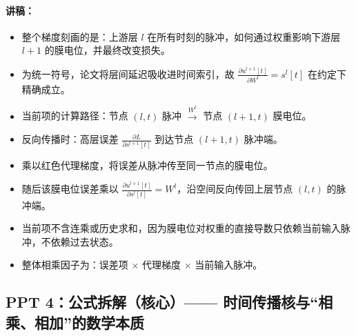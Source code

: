\documentclass[journal,12pt,onecolumn]{IEEEtran}
\begin{document}
\paragraph{\textbf{讲稿：}}
\begin{itemize}
    \item 整个梯度刻画的是：上游层 \(l\) 在所有时刻的脉冲，如何通过权重影响下游层 \(l+1\) 的膜电位，并最终改变损失。
    \item 为统一符号，论文将层间延迟吸收进时间索引，故 \(\frac{\partial u^{l+1}[t]}{\partial W^l} = s^l[t]\) 在约定下精确成立。
    \item 当前项的计算路径：节点 \((l, t)\) 脉冲 \(\xrightarrow{W^l}\) 节点 \((l+1, t)\) 膜电位。
    \item 反向传播时：高层误差 \(\frac{\partial L}{\partial s^{l+1}[t]}\) 到达节点 \((l+1, t)\) 脉冲端。
    \item 乘以红色代理梯度，将误差从脉冲传至同一节点的膜电位。
    \item 随后该膜电位误差乘以 \(\frac{\partial u^{l+1}[t]}{\partial s^l[t]} = W^l\)，沿空间反向传回上层节点 \((l, t)\) 的脉冲端。
    \item 当前项不含连乘或历史求和，因为膜电位对权重的直接导数只依赖当前输入脉冲，不依赖过去状态。
    \item 整体相乘因子为：误差项 × 代理梯度 × 当前输入脉冲。
\end{itemize}

\subsection*{PPT 4：公式拆解（核心）—— 时间传播核与“相乘、相加”的数学本质}
\end{document}
